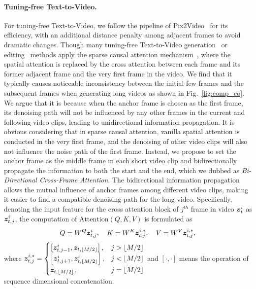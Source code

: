 \documentclass{article}
\begin{document}
\paragraph{Tuning-free Text-to-Video.}\label{sec:tftv}
For tuning-free Text-to-Video, we follow the pipeline of Pix2Video~\cite{ceylan2023pix2video} for its efficiency, with an additional distance penalty among adjacent frames to avoid dramatic changes. Though many tuning-free Text-to-Video generation~\cite{khachatryan2023text2video} or editing~\cite{ceylan2023pix2video,qi2023fatezero} methods apply the sparse causal attention mechanism~\cite{wu2022tune}, where the spatial attention is replaced by the cross attention between each frame and its former adjacent frame and the very first frame in the video. We find that it typically causes noticeable inconsistency between the initial few frames and the subsequent frames when generating long videos as shown in Fig.~\ref{fig:comp_co}. We argue that it is because when the anchor frame is chosen as the first frame, its denoising path will not be influenced by any other frames in the current and following video clips, leading to unidirectional information propagation. It is obvious considering that in sparse causal attention, vanilla spatial attention is conducted in the very first frame, and the denoising of other video clips will also not influence the noise path of the first frame.  Instead, we propose to set the anchor frame as the middle frame in each short video clip and bidirectionally propagate the information to both the start and the end, which we dubbed as \textit{Bi-Directional Cross-Frame Attention}. The bidirectional information propagation allows the mutual influence of anchor frames among different video clips, making it easier to find a compatible denoising path for the long video.  Specifically, denoting the input feature for the cross attention block of $j^{th}$ frame in video ${\bm{v}}_{t}^i$ as ${\bm{z}}_{t,j}^i$, the computation of $\mathrm{Attention}(Q,K,V)$ is formulated as 
\begin{align*}
     Q=W^Q {\bm{z}}_{t,j}^i, \quad K= W^K {\bm{z}}_{t,j}^{i,*}, \quad V=W^V {\bm{z}}_{t,j}^{i,*},
\end{align*}
where ${\bm{z}}_{t,j}^{i,*} = \begin{cases} 
\left[{\bm{z}}_{t,j-1}^i, {\bm{z}}_{t,\lfloor M/2 \rfloor}\right], & j>\lfloor M/2 \rfloor\\
\left[{\bm{z}}_{t,j+1}^i, {\bm{z}}_{t,\lfloor M/2 \rfloor}^{i}\right], & j < \lfloor M/2 \rfloor\\
{\bm{z}}_{t,\lfloor M/2 \rfloor}, & j = \lfloor M/2 \rfloor
\end{cases}$ and $[\cdot,\cdot]$ means the operation of sequence dimensional concatenation. 
\end{document}
